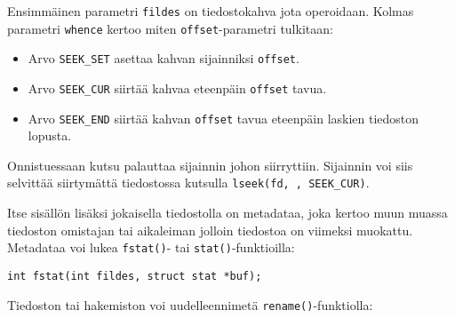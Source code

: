 Ensimmäinen parametri \texttt{fildes} on tiedostokahva jota operoidaan.
Kolmas parametri \texttt{whence} kertoo miten \texttt{offset}-parametri tulkitaan:

\begin{itemize}
    \item Arvo \texttt{SEEK\_SET} asettaa kahvan sijainniksi \texttt{offset}.
    \item Arvo \texttt{SEEK\_CUR} siirtää kahvaa eteenpäin \texttt{offset} tavua.
    \item Arvo \texttt{SEEK\_END} siirtää kahvan \texttt{offset} tavua eteenpäin laskien tiedoston lopusta.
\end{itemize}

Onnistuessaan kutsu palauttaa sijainnin johon siirryttiin.
Sijainnin voi siis selvittää siirtymättä tiedostossa kutsulla \texttt{lseek(fd, , SEEK\_CUR)}.

Itse sisällön lisäksi jokaisella tiedostolla on metadataa,
joka kertoo muun muassa tiedoston omistajan tai aikaleiman jolloin tiedostoa on viimeksi muokattu.
Metadataa voi lukea \texttt{fstat()}- tai \texttt{stat()}-funktioilla:

\begin{verbatim}
int fstat(int fildes, struct stat *buf);
\end{verbatim}

%


Tiedoston tai hakemiston voi uudelleennimetä \texttt{rename()}-funktiolla:

